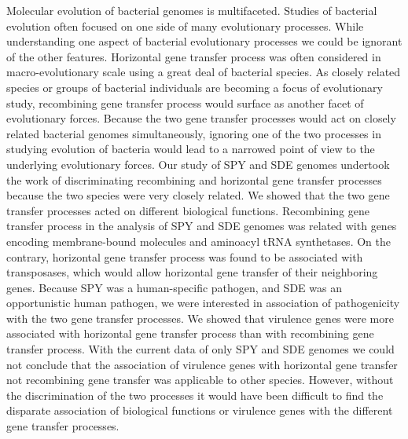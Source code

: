 \documentclass[10pt]{article}
\begin{document}
Molecular evolution of bacterial genomes is multifaceted. Studies of bacterial
evolution often focused on one side of many evolutionary processes.  While
understanding one aspect of bacterial evolutionary processes we could be
ignorant of the other features.  Horizontal gene transfer process was often
considered in macro-evolutionary scale using a great deal of bacterial species.
As closely related species or groups of bacterial individuals are becoming a
focus of evolutionary study, recombining gene transfer process would surface as
another facet of evolutionary forces.  Because the two gene transfer processes
would act on closely related bacterial genomes simultaneously, ignoring one of the two processes
in studying evolution of bacteria would lead to a narrowed point of view to the
underlying evolutionary forces. Our study of SPY and SDE genomes undertook the
work of discriminating recombining and horizontal gene transfer
processes because the two species were very closely related.  We showed that the
two gene transfer processes acted on different biological functions. 
Recombining
gene transfer process in the analysis of SPY and SDE genomes was related with
genes encoding membrane-bound molecules and aminoacyl tRNA synthetases. On the
contrary, horizontal gene transfer process was found to be associated with
transposases, which would allow horizontal gene transfer of their neighboring
genes.  Because SPY was a human-specific pathogen, and SDE was an opportunistic
human pathogen, we were interested in association of pathogenicity with the two
gene transfer processes. We showed that virulence genes were more associated
with 
horizontal gene transfer process than with recombining gene transfer process.
With the current data of only SPY and SDE genomes we could not conclude that the
association of virulence genes with horizontal gene transfer not recombining
gene transfer was applicable to other species.  However, without the
discrimination of the two processes it would have been difficult to find the
disparate association of biological functions or virulence genes with the
different gene transfer processes. 
\end{document}
